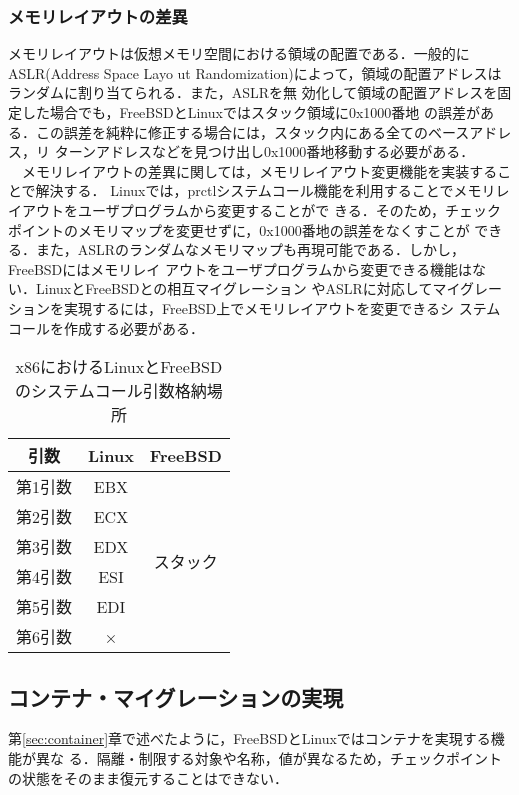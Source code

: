 \documentclass[11pt]{jarticle}
\begin{document}
  \subsubsection{メモリレイアウトの差異}
  メモリレイアウトは仮想メモリ空間における領域の配置である．一般的にASLR(Address Space
  Layo
  ut Randomization)によって，領域の配置アドレスはランダムに割り当てられる．また，ASLRを無
  効化して領域の配置アドレスを固定した場合でも，FreeBSDとLinuxではスタック領域に0x1000番地
  の誤差がある．この誤差を純粋に修正する場合には，スタック内にある全てのベースアドレス，リ
  ターンアドレスなどを見つけ出し0x1000番地移動する必要がある．\\
  　メモリレイアウトの差異に関しては，メモリレイアウト変更機能を実装することで解決する．
Linuxでは，prctlシステムコール機能を利用することでメモリレイアウトをユーザプログラムから変更することがで
きる．そのため，チェックポイントのメモリマップを変更せずに，0x1000番地の誤差をなくすことが
できる．また，ASLRのランダムなメモリマップも再現可能である．しかし，FreeBSDにはメモリレイ
アウトをユーザプログラムから変更できる機能はない．LinuxとFreeBSDとの相互マイグレーション
やASLRに対応してマイグレーションを実現するには，FreeBSD上でメモリレイアウトを変更できるシ
ステムコールを作成する必要がある．
\begin{table}[t]
\vspace{-1.0em}
  \caption{x86におけるLinuxとFreeBSDのシステムコール引数格納場所}
  \label{tb:argument}
  \begin{center}
  \begin{tabular}{|c|c|c|} \hline
    引数 & Linux & FreeBSD \\ \hline \hline
    第1引数 & EBX &\multirow{6}{*}{スタック}   \\ \cline{1-2}
    第2引数 & ECX &  \\ \cline{1-2}
    第3引数 & EDX &  \\ \cline{1-2}
    第4引数 & ESI & \\ \cline{1-2}
    第5引数 & EDI &  \\ \cline{1-2}
    第6引数 & × &  \\ \hline
  \end{tabular}
\end{center}
\end{table}

\subsection{コンテナ・マイグレーションの実現}
\label{sec:CM}
第\ref{sec:container}章で述べたように，FreeBSDとLinuxではコンテナを実現する機能が異な
る．隔離・制限する対象や名称，値が異なるため，チェックポイントの状態をそのまま復元することはできない．
\end{document}
